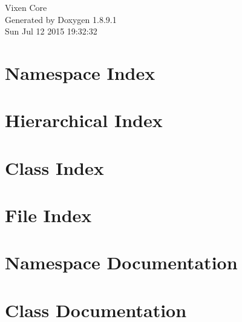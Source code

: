 \documentclass[twoside]{book}
\newcommand{\+}{\discretionary{\mbox{\scriptsize$\hookleftarrow$}}{}{}}
\newcommand{\clearemptydoublepage}{%
  \newpage{\pagestyle{empty}\cleardoublepage}%
}
\begin{document}
\hypersetup{pageanchor=false,
             bookmarks=true,
             bookmarksnumbered=true,
             pdfencoding=unicode
            }
\begin{titlepage}
\vspace*{7cm}
\begin{center}%
{\Large Vixen Core }\\
\vspace*{1cm}
{\large Generated by Doxygen 1.8.9.1}\\
\vspace*{0.5cm}
{\small Sun Jul 12 2015 19:32:32}\\
\end{center}
\end{titlepage}
\clearemptydoublepage
\tableofcontents
\clearemptydoublepage
{}
\hypersetup{pageanchor=true}

\chapter{Namespace Index}

\chapter{Hierarchical Index}

\chapter{Class Index}

\chapter{File Index}

\chapter{Namespace Documentation}

\chapter{Class Documentation}










\end{document}

